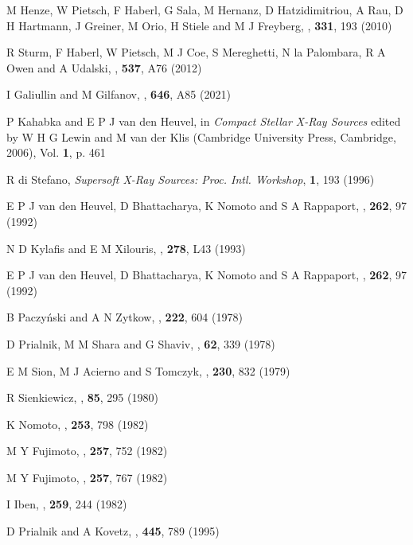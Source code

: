 \begin{thebibliography}{100}
	M Henze, W Pietsch, F Haberl, G Sala, M Hernanz, D Hatzidimitriou, A Rau, D H Hartmann, J Greiner, M Orio, H Stiele and M J Freyberg, \textit{\ANAN}, \textbf{331}, 193 (2010)

	R Sturm, F Haberl, W Pietsch, M J Coe, S Mereghetti, N la Palombara,
R A Owen and A Udalski, \textit{\AnA}, \textbf{537}, A76 (2012)

	I Galiullin and M Gilfanov, \textit{\AnA}, \textbf{646}, A85 (2021)
	
	P Kahabka and E P J van den Heuvel, in \textit{Compact Stellar X-Ray Sources} edited by W H G Lewin and M van der Klis (Cambridge University Press, Cambridge, 2006), Vol. \textbf{1}, p. 461
	
	R di Stefano, \textit{Supersoft X-Ray Sources: Proc. Intl. Workshop}, \textbf{1}, 193 (1996)
	
	E P J van den Heuvel, D Bhattacharya, K Nomoto and S A Rappaport, \textit{\AnA}, \textbf{262}, 97 (1992)
	
	N D Kylafis and E M Xilouris, \textit{\AnA}, \textbf{278}, L43 (1993)

	E P J van den Heuvel, D Bhattacharya, K Nomoto and S A Rappaport, \textit{\AnA}, \textbf{262}, 97 (1992)
	
	B Paczy{\'n}ski and A N Zytkow, \textit{\ApJ}, \textbf{222}, 604 (1978)
	
	D Prialnik, M M Shara and G Shaviv, \textit{\AnA}, \textbf{62}, 339 (1978)

	E M Sion, M J Acierno and S Tomczyk, \textit{\ApJ}, \textbf{230}, 832 (1979)

	R Sienkiewicz, \textit{\AnA}, \textbf{85}, 295 (1980)
	
	K Nomoto, \textit{\ApJ}, \textbf{253}, 798 (1982)
	
	M Y Fujimoto, \textit{\ApJ}, \textbf{257}, 752 (1982)
	
	M Y Fujimoto, \textit{\ApJ}, \textbf{257}, 767 (1982)
	
	I Iben, \textit{\ApJ}, \textbf{259}, 244 (1982)

	D Prialnik and A Kovetz, \textit{\ApJ}, \textbf{445}, 789 (1995)
	

\end{thebibliography}
